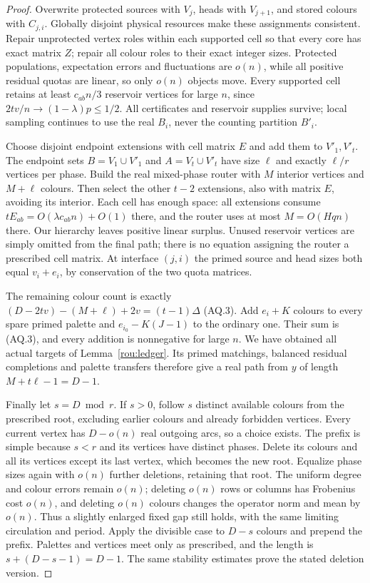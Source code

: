 \begin{proof}
Overwrite protected sources with $V_j$, heads with $V_{j+1}$, and stored colours with $C_{j,i}$. Globally disjoint physical resources make these assignments consistent. Repair unprotected vertex roles
within each supported cell so that every core has exact matrix $Z$; repair all colour roles to their exact integer sizes. Protected
populations, expectation errors and fluctuations are $o(n)$, while all positive residual quotas are linear, so only $o(n)$ objects move. Every supported cell retains at least $c_{ab}n/3$ reservoir vertices for large $n$, since $2tv/n\to(1-\lambda)p\le1/2$. All certificates and reservoir supplies survive; local sampling
continues to use the real $B_i$, never the counting partition $B'_i$.

Choose disjoint endpoint extensions with cell matrix $E$ and add them to $V'_1,V'_t$. The endpoint sets $B=V_1\cup{}V'_1$ and $A=V_t\cup{}V'_t$ have size $\ell$ and exactly $\ell/r$ vertices per phase. Build the real mixed-phase router with $M$ interior vertices and $M+\ell$ colours. Then select the other $t-2$ extensions, also with matrix $E$, avoiding its interior. Each cell has enough space: all extensions consume $tE_{ab}=O(\lambda{}c_{ab}n)+O(1)$ there, and the router uses at most $M=O(Hqn)$ there. Our hierarchy leaves positive linear surplus. Unused reservoir vertices are simply omitted from the final path;
there is no equation assigning the router a prescribed cell matrix.
At interface $(j,i)$ the primed source and head sizes both equal $v_i+e_i$, by conservation of the two quota matrices.

The remaining colour count is exactly $(D-2tv)-(M+\ell)+2v=(t-1)\Delta$ \textup{(AQ.3)}. Add $e_i+K$ colours to every spare primed palette and $e_{i_0}-K(J-1)$ to the ordinary one. Their sum is (AQ.3), and every addition is nonnegative for large $n$. We have obtained all actual targets of Lemma~\ref{rou:ledger}. Its primed matchings,
balanced residual completions and palette transfers therefore give
a real path from $y$ of length $M+t\ell-1=D-1$.

Finally let $s=D\bmod{}r$. If $s>0$, follow $s$ distinct available colours from the prescribed root, excluding earlier colours and
already forbidden vertices. Every current vertex has $D-o(n)$ real outgoing arcs, so a choice exists. The prefix is simple because $s<r$ and its vertices have distinct phases. Delete its colours and all its vertices except its last vertex, which becomes the new
root. Equalize phase sizes again with $o(n)$ further deletions, retaining that root. The uniform degree and colour errors remain $o(n)$; deleting $o(n)$ rows or columns has Frobenius cost $o(n)$, and deleting $o(n)$ colours changes the operator norm and mean by $o(n)$. Thus a slightly enlarged fixed gap still holds, with the same limiting circulation and period. Apply the divisible case to $D-s$ colours and prepend the prefix. Palettes and vertices meet only as prescribed, and the length is $s+(D-s-1)=D-1$. The same stability estimates prove the stated deletion version.
\end{proof}
